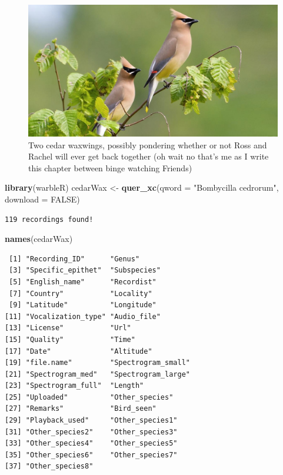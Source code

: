 \documentclass[
]{krantz}
\makeatletter
\newenvironment{Shaded}{\begin{snugshade}}{\end{snugshade}}
\newcommand{\DataTypeTok}[1]{\textcolor[rgb]{0.27,0.27,0.27}{#1}}
\newcommand{\KeywordTok}[1]{\textcolor[rgb]{0.27,0.27,0.27}{\textbf{#1}}}
\newcommand{\NormalTok}[1]{#1}
\newcommand{\OtherTok}[1]{\textcolor[rgb]{0.37,0.37,0.37}{#1}}
\newcommand{\StringTok}[1]{\textcolor[rgb]{0.5,0.5,0.5}{#1}}
\newenvironment{kframe}{%
\medskip{}
\setlength{\fboxsep}{.8em}
 \def\at@end@of@kframe{}%
 \ifinner\ifhmode%
  \def\at@end@of@kframe{\end{minipage}}%
  \begin{minipage}{\columnwidth}%
 \fi\fi%
 \def\FrameCommand##1{\hskip\@totalleftmargin \hskip-\fboxsep
 \colorbox{shadecolor}{##1}\hskip-\fboxsep
     \hskip-\linewidth \hskip-\@totalleftmargin \hskip\columnwidth}%
 \MakeFramed {\advance\hsize-\width
   \@totalleftmargin\z@ \linewidth\hsize
   \@setminipage}}%
 {\par\unskip\endMakeFramed%
 \at@end@of@kframe}
\renewenvironment{Shaded}{\begin{kframe}}{\end{kframe}}
\makeatother
\begin{document}
\begin{figure}
\includegraphics[width=1\linewidth]{figures/cedarWaxwing} \caption{Two cedar waxwings, possibly pondering whether or not Ross and Rachel will ever get back together (oh wait no that's me as I write this chapter between binge watching Friends)}\label{fig:waxwing}
\end{figure}

\begin{Shaded}
\begin{Highlighting}[]
\KeywordTok{library}\NormalTok{(warbleR)}
\NormalTok{cedarWax \textless{}{-}}\StringTok{ }\KeywordTok{quer\_xc}\NormalTok{(}\DataTypeTok{qword =} \StringTok{"Bombycilla cedrorum"}\NormalTok{, }\DataTypeTok{download =} \OtherTok{FALSE}\NormalTok{)}
\end{Highlighting}
\end{Shaded}

\begin{verbatim}
119 recordings found!
\end{verbatim}

\begin{Shaded}
\begin{Highlighting}[]
\KeywordTok{names}\NormalTok{(cedarWax)}
\end{Highlighting}
\end{Shaded}

\begin{verbatim}
 [1] "Recording_ID"      "Genus"            
 [3] "Specific_epithet"  "Subspecies"       
 [5] "English_name"      "Recordist"        
 [7] "Country"           "Locality"         
 [9] "Latitude"          "Longitude"        
[11] "Vocalization_type" "Audio_file"       
[13] "License"           "Url"              
[15] "Quality"           "Time"             
[17] "Date"              "Altitude"         
[19] "file.name"         "Spectrogram_small"
[21] "Spectrogram_med"   "Spectrogram_large"
[23] "Spectrogram_full"  "Length"           
[25] "Uploaded"          "Other_species"    
[27] "Remarks"           "Bird_seen"        
[29] "Playback_used"     "Other_species1"   
[31] "Other_species2"    "Other_species3"   
[33] "Other_species4"    "Other_species5"   
[35] "Other_species6"    "Other_species7"   
[37] "Other_species8"   
\end{verbatim}
\end{document}
